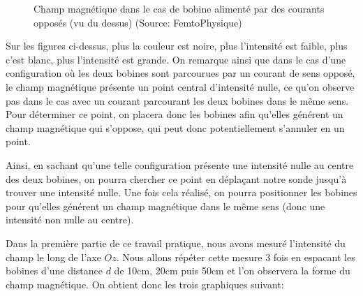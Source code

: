 \documentclass[12pt]{article}
\begin{document}
\begin{figure}[h!]
    \centering
    \quad \quad
    \caption{Champ magnétique dans le cas de bobine alimenté par des courants opposés (vu du dessus) (Source: FemtoPhysique)}
\end{figure}
Sur les figures ci-dessus, plus la couleur est noire, plus l'intensité est faible, plus c'est blanc, plus l'intensité est grande. On remarque ainsi que dans le cas d'une configuration
où les deux bobines sont parcourues par un courant de sens opposé, le champ magnétique présente un point central d'intensité nulle, ce qu'on observe pas dans le cas avec un courant 
parcourant les deux bobines dans le même sens. Pour déterminer ce point, on placera donc les bobines afin qu'elles générent un champ magnétique qui s'oppose, qui peut donc potentiellement s'annuler en un point.

Ainsi, en sachant qu'une telle configuration présente une intensité nulle au centre des deux bobines, on pourra chercher ce point en déplaçant notre sonde jusqu'à trouver une 
intensité nulle. Une fois cela réalisé, on pourra positionner les bobines pour qu'elles générent un champ magnétique dans le même sens (donc une intensité non nulle au centre). 

Dans la première partie de ce travail pratique, nous avons mesuré l'intensité du champ le long de l'axe $Oz$. Nous allons répéter cette mesure 3 fois en espacant les bobines d'une distance $d$
de 10cm, 20cm puis 50cm et l'on observera la forme du champ magnétique. On obtient donc les trois graphiques suivant:
\end{document}
